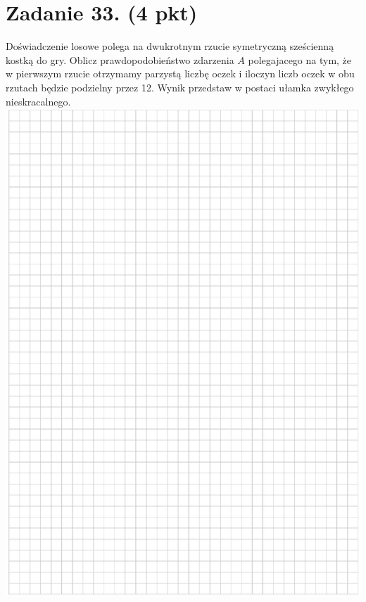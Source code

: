 \documentclass[10pt]{article}
\begin{document}
\section*{Zadanie 33. (4 pkt)}
Doświadczenie losowe polega na dwukrotnym rzucie symetryczną sześcienną kostką do gry. Oblicz prawdopodobieństwo zdarzenia \(A\) polegajacego na tym, że w pierwszym rzucie otrzymamy parzystą liczbę oczek i iloczyn liczb oczek w obu rzutach będzie podzielny przez 12. Wynik przedstaw w postaci ułamka zwykłego nieskracalnego.\\
\includegraphics[max width=\textwidth, center]{2024_11_21_caf6b2e64dd65c9b24eeg-16}\\
\end{document}
